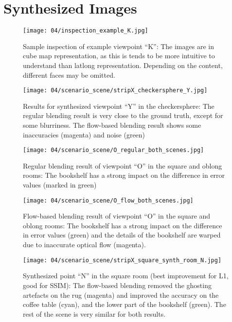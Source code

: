 \chapter{Synthesized Images}\label{imgs}

\begin{figure}
		\centering
		\texttt{[image: 04/inspection\_example\_K.jpg]}
		\caption[Sample inspection of viewpoint ``K'']{Sample inspection of example viewpoint ``K'': The images are in cube map representation, as this is tends to be more intuitive to understand than latlong representation. Depending on the content, different faces may be omitted.}
		\label{fig:inspection_example}
\end{figure}


\begin{figure}
		\centering
    \texttt{[image: 04/scenario\_scene/stripX\_checkersphere\_Y.jpg]}
		\caption[Viewpoint ``Y'' in the checkersphere]{Results for synthesized viewpoint ``Y'' in the checkersphere: The regular blending result is very close to the ground truth, except for some blurriness. The flow-based blending result shows some inaccuracies (magenta) and noise (green)}
		\label{fig:scene_checkersphere_Y}
\end{figure}

\begin{figure}
		\centering
    \texttt{[image: 04/scenario\_scene/O\_regular\_both\_scenes.jpg]}
		\caption[Regular blending results of ``O'']{Regular blending result of viewpoint ``O'' in the square and oblong rooms: The bookshelf has a strong impact on the difference in error values (marked in green)}
		\label{fig:scene_O_regular}
\end{figure}

\begin{figure}
		\centering
    \texttt{[image: 04/scenario\_scene/O\_flow\_both\_scenes.jpg]}
		\caption[Flow-based blending results of ``O'']{Flow-based blending result of viewpoint ``O'' in the square and oblong rooms: The bookshelf has a strong impact on the difference in error values (green) and the details of the bookshelf are warped due to inaccurate optical flow (magenta).}
		\label{fig:scene_O_flow}
\end{figure}

\begin{figure}
  \centering
  \texttt{[image: 04/scenario\_scene/stripX\_square\_synth\_room\_N.jpg]}
  \caption[Viewpoint ``N'' in the square room]{Synthesized point ``N'' in the square room (best improvement for L1, good for SSIM): The flow-based blending removed the ghosting artefacts on the rug (magenta) and improved the accuracy on the coffee table (cyan), and the lower part of the bookshelf (green). The rest of the scene is very similar for both results.}
  \label{fig:scene_square_N}
\end{figure}


